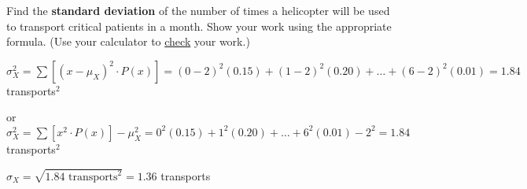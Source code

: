 \documentclass[noanswers]{exam}
\begin{document}
\begin{questions}
\begin{solution}[\stretch{1}]
	\vspace{2mm}
	\end{solution}
	
	\question Find the \textbf{standard deviation} of the number of times a helicopter will be used to transport critical patients in a month. Show your work using the appropriate formula. (Use your calculator to \underline{check} your work.)
	
	\begin{solution}[\stretch{1}]
	\vspace{2mm}
	$\sigma_X^2=\sum \left[(x-\mu_X)^2\cdot P(x)\right]= (0-2)^2(0.15)+(1-2)^2(0.20)+\dots+(6-2)^2(0.01)=1.84$ transports$^2$
	
	\vspace{3mm}
	
	or $\sigma_X^2=\sum \left[ x^2 \cdot P(x) \right] -\mu_X^2 = 0^2(0.15)+1^2(0.20)+\dots+6^2(0.01)-2^2=1.84$ transports$^2$
	\vspace{3mm}
	
	$\sigma_X=\sqrt{1.84 \text{ transports}^2}=1.36$ transports
	\end{solution}
	
\end{questions}
\end{document}
